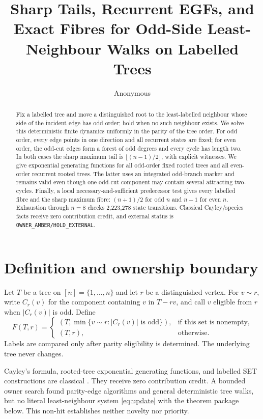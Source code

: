 \documentclass[a4paper,10pt]{amsart}
\title[Odd-side least-neighbour walks]{Sharp Tails, Recurrent EGFs, and
Exact Fibres for Odd-Side Least-Neighbour Walks on Labelled Trees}
\author{Anonymous}
\date{}
\theoremstyle{remark}
\begin{document}
\begin{abstract}
Fix a labelled tree and move a distinguished root to the least-labelled
neighbour whose side of the incident edge has odd order; hold when no such
neighbour exists.  We solve this deterministic finite dynamics uniformly in
the parity of the tree order.  For odd order, every edge points in one
direction and all recurrent states are fixed; for even order, the odd-cut
edges form a forest of odd degrees and every cycle has length two.  In both
cases the sharp maximum tail is $\lfloor(n-1)/2\rfloor$, with explicit
witnesses.  We give exponential generating functions for all odd-order fixed
rooted trees and all even-order recurrent rooted trees.  The latter uses an
integrated odd-branch marker and remains valid even though one odd-cut
component may contain several attracting two-cycles.  Finally, a local
necessary-and-sufficient predecessor test gives every labelled fibre and the
sharp maximum fibre: $(n+1)/2$ for odd $n$ and $n-1$ for even $n$.
Exhaustion through $n=8$ checks 2,223,278 state transitions.  Classical
Cayley/species facts receive zero contribution credit, and external status
is \texttt{OWNER\_AMBER/HOLD\_EXTERNAL}.
\end{abstract}

\maketitle

\section{Definition and ownership boundary}

Let $T$ be a tree on $[n]=\{1,\ldots,n\}$ and let $r$ be a distinguished
vertex.  For $v\sim r$, write $C_r(v)$ for the component containing $v$ in
$T-rv$, and call $v$ eligible from $r$ when $|C_r(v)|$ is odd.  Define
\begin{equation}\label{eq:update}
 F(T,r)=\begin{cases}
 (T,\min\{v\sim r:|C_r(v)|\text{ is odd}\}),&\text{if this set is nonempty},\\
 (T,r),&\text{otherwise}.
 \end{cases}
\end{equation}
Labels are compared only after parity eligibility is determined.  The
underlying tree never changes.

Cayley's formula, rooted-tree exponential generating functions, and labelled
SET constructions are classical \cite{Moon1970,BergeronLabelleLeroux1998,
BostanJimenezPastor2020,FlajoletSedgewick2009}.  They receive zero
contribution credit.  A bounded owner search found parity-edge algorithms and
general deterministic tree walks, but no literal least-neighbour system
\eqref{eq:update} with the theorem package below.  This non-hit establishes
neither novelty nor priority.
\end{document}
